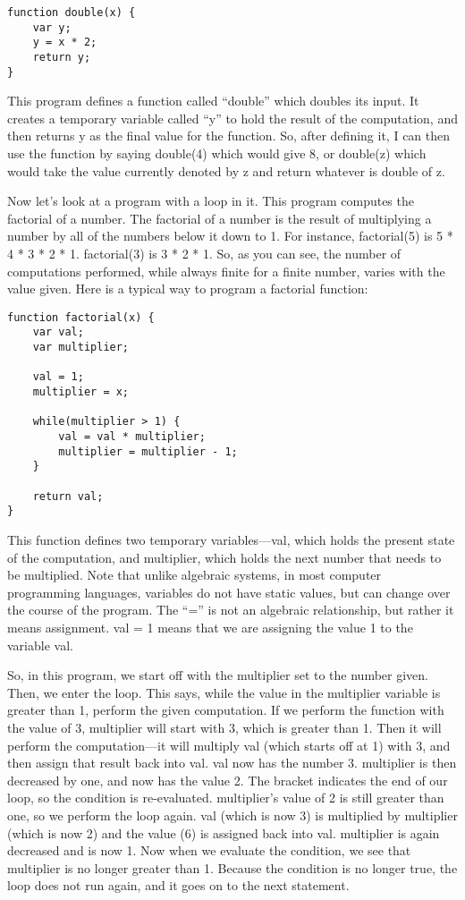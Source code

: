 \begin{verbatim}
function double(x) {
	var y;
	y = x * 2;
	return y;
}
\end{verbatim}

This program defines a function called ``double'' which doubles its input.  It creates a temporary variable called ``y'' to hold the result of the computation, and then returns y as the final value for the function.  So, after defining it, I can then use the function by saying double(4) which would give 8, or double(z) which would take the value currently denoted by z and return whatever is double of z.

Now let's look at a program with a loop in it.  This program computes the factorial of a number.  The factorial of a number is the result of multiplying a number by all of the numbers below it down to 1.  For instance, factorial(5) is 5 * 4 * 3 * 2 * 1.  factorial(3) is 3 * 2 * 1.  So, as you can see, the number of computations performed, while always finite for a finite number, varies with the value given.  Here is a typical way to program a factorial function:

\begin{verbatim}
function factorial(x) {
	var val;
	var multiplier;

	val = 1;
	multiplier = x;

	while(multiplier > 1) {
		val = val * multiplier;
		multiplier = multiplier - 1;
	}

	return val;
}
\end{verbatim}

This function defines two temporary variables---val, which holds the present state of the computation, and multiplier, which holds the next number that needs to be multiplied.  Note that unlike algebraic systems, in most computer programming languages, variables do not have static values, but can change over the course of the program.  The ``='' is not an algebraic relationship, but rather it means assignment.  val = 1 means that we are assigning the value 1 to the variable val.  

So, in this program, we start off with the multiplier set to the number given.  Then, we enter the loop.  This says, while the value in the multiplier variable is greater than 1, perform the given computation.  If we perform the function with the value of 3, multiplier will start with 3, which is greater than 1.  Then it will perform the computation---it will multiply val (which starts off at 1) with 3, and then assign that result back into val.  val now has the number 3.  multiplier is then decreased by one, and now has the value 2.  The bracket indicates the end of our loop, so the condition is re-evaluated.  multiplier's value of 2 is still greater than one, so we perform the loop again.  val (which is now 3) is multiplied by multiplier (which is now 2) and the value (6) is assigned back into val.  multiplier is again decreased and is now 1.  Now when we evaluate the condition, we see that multiplier is no longer greater than 1.  Because the condition is no longer true, the loop does not run again, and it goes on to the next statement.  

